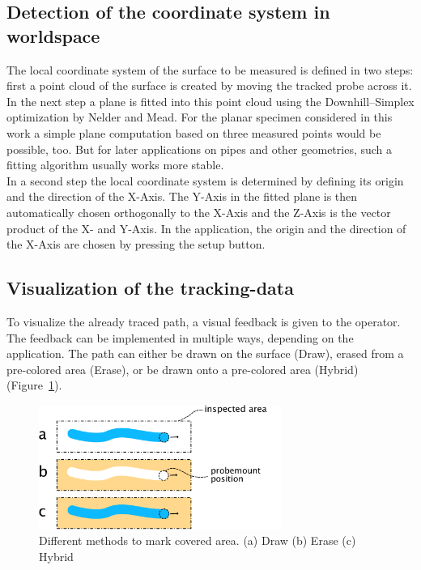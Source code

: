 \documentclass{VRARWorkshop}
\begin{document}
\subsection{Detection of the coordinate system in worldspace}
The local coordinate system of the surface to be measured is defined in two steps:
first a point cloud of the surface is created by moving the tracked probe across it.
In the next step a plane is fitted into this point cloud using the Downhill--Simplex optimization by Nelder and Mead. For the planar specimen considered in this work a simple plane computation based on three measured points
would be possible, too. But for later applications on pipes and other geometries, such a fitting algorithm usually works more stable. \\
In a second step the local coordinate system is determined by defining its origin and the direction of the X-Axis. 
The Y-Axis in the fitted plane is then automatically chosen orthogonally to the X-Axis and the Z-Axis is the vector product of the X- and Y-Axis. 
In the application, the origin and the direction of the X-Axis are chosen by pressing the setup button.


\subsection{Visualization of the tracking-data}
\label{sec:DrawVsErase}
To visualize the already traced path, a visual feedback is given to the operator.
The feedback can be implemented in multiple ways, depending on the application.
The path can either be drawn on the surface ({\sc Draw}), erased from a pre-colored area ({\sc Erase}), or be drawn onto a pre-colored area ({\sc Hybrid}) (Figure~\ref{fig:DrawVsErase}).

\begin{figure}[h!]
    \begin{center}
        \includegraphics[width=79mm]{images/DrawVsErase}
        \caption{\label{fig:DrawVsErase} Different methods to mark covered area. (a) {\sc Draw} (b) {\sc Erase} (c) {\sc Hybrid}}
    \end{center}
\end{figure}
\end{document}
